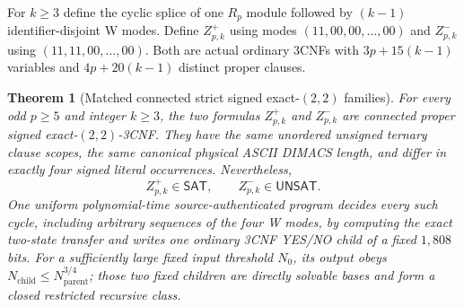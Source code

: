 \documentclass[11pt]{article}
\newtheorem{theorem}{Theorem}
\newcommand{\SAT}{\mathsf{SAT}}
\newcommand{\UNSAT}{\mathsf{UNSAT}}
\begin{document}
For $k\ge3$ define the cyclic splice of one $R_p$ module followed by $(k-1)$ identifier-disjoint W modes. Define $Z^+_{p,k}$ using modes $(11,00,00,\ldots,00)$ and $Z^-_{p,k}$ using $(11,11,00,\ldots,00)$. Both are actual ordinary 3CNFs with $3p+15(k-1)$ variables and $4p+20(k-1)$ distinct proper clauses.
\begin{theorem}[Matched connected strict signed exact-$(2,2)$ families]\label{th:matched}
For every odd $p\ge5$ and integer $k\ge3$, the two formulas $Z^+_{p,k}$ and $Z^-_{p,k}$ are connected proper signed exact-$(2,2)$-3CNF. They have the \emph{same unordered unsigned ternary clause scopes}, the same canonical physical ASCII DIMACS length, and differ in exactly four signed literal occurrences. Nevertheless,
\[Z^+_{p,k}\in\SAT,\qquad Z^-_{p,k}\in\UNSAT.\tag{3}\]
One uniform polynomial-time source-authenticated program decides every such cycle, including arbitrary sequences of the four W modes, by computing the exact two-state transfer and writes one ordinary 3CNF YES/NO child of a fixed $1{,}808$ bits. For a sufficiently large fixed input threshold $N_0$, its output obeys $N_{\mathrm{child}}\le N_{\mathrm{parent}}^{3/4}$; those two fixed children are directly solvable bases and form a closed restricted recursive class.
\end{theorem}
\end{document}
